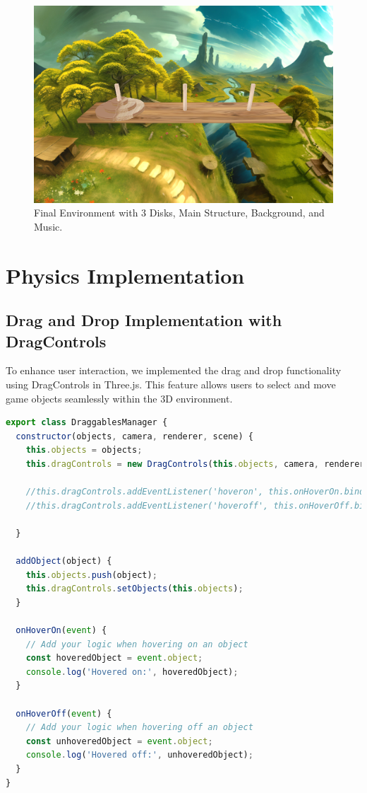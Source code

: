 \documentclass{article}
\begin{document}
\begin{figure}[h]
    \centering
    \includegraphics[width=1\textwidth]{img/result.png}
    \caption{Final Environment with 3 Disks, Main Structure, Background, and Music.}
    \label{fig:final_environment}
\end{figure}

\section{Physics Implementation}
\subsection{Drag and Drop Implementation with DragControls}

To enhance user interaction, we implemented the drag and drop functionality using DragControls in Three.js. This feature allows users to select and move game objects seamlessly within the 3D environment.

\begin{lstlisting}[language=JavaScript, caption={JS Class for Drag Control}]
export class DraggablesManager {
  constructor(objects, camera, renderer, scene) {
    this.objects = objects;
    this.dragControls = new DragControls(this.objects, camera, renderer.domElement);

    //this.dragControls.addEventListener('hoveron', this.onHoverOn.bind(this));
    //this.dragControls.addEventListener('hoveroff', this.onHoverOff.bind(this));

  }

  addObject(object) {
    this.objects.push(object);
    this.dragControls.setObjects(this.objects);
  }

  onHoverOn(event) {
    // Add your logic when hovering on an object
    const hoveredObject = event.object;
    console.log('Hovered on:', hoveredObject);
  }

  onHoverOff(event) {
    // Add your logic when hovering off an object
    const unhoveredObject = event.object;
    console.log('Hovered off:', unhoveredObject);
  }
}
\end{lstlisting}
\end{document}
